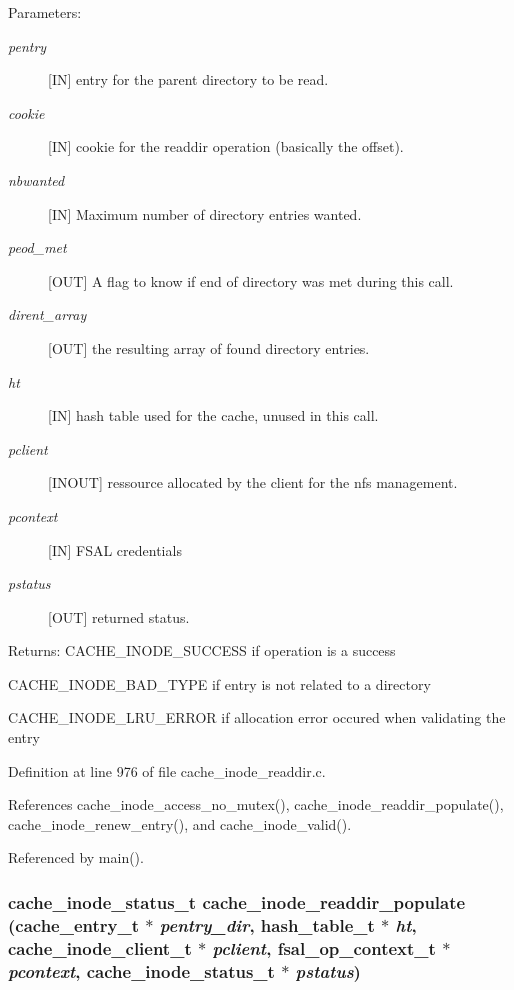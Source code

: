 \begin{Desc}
\item[Parameters:]
\begin{description}
\item[{\em pentry}][IN] entry for the parent directory to be read. \item[{\em cookie}][IN] cookie for the readdir operation (basically the offset). \item[{\em nbwanted}][IN] Maximum number of directory entries wanted. \item[{\em peod\_\-met}][OUT] A flag to know if end of directory was met during this call. \item[{\em dirent\_\-array}][OUT] the resulting array of found directory entries. \item[{\em ht}][IN] hash table used for the cache, unused in this call. \item[{\em pclient}][INOUT] ressource allocated by the client for the nfs management. \item[{\em pcontext}][IN] FSAL credentials \item[{\em pstatus}][OUT] returned status.\end{description}
\end{Desc}
\begin{Desc}
\item[Returns:]CACHE\_\-INODE\_\-SUCCESS if operation is a success \par
 

CACHE\_\-INODE\_\-BAD\_\-TYPE if entry is not related to a directory\par
 

CACHE\_\-INODE\_\-LRU\_\-ERROR if allocation error occured when validating the entry \end{Desc}


Definition at line 976 of file cache\_\-inode\_\-readdir.c.

References cache\_\-inode\_\-access\_\-no\_\-mutex(), cache\_\-inode\_\-readdir\_\-populate(), cache\_\-inode\_\-renew\_\-entry(), and cache\_\-inode\_\-valid().

Referenced by main().
\subsubsection{\setlength{\rightskip}{0pt plus 5cm}cache\_\-inode\_\-status\_\-t cache\_\-inode\_\-readdir\_\-populate (cache\_\-entry\_\-t $\ast$ {\em pentry\_\-dir}, hash\_\-table\_\-t $\ast$ {\em ht}, cache\_\-inode\_\-client\_\-t $\ast$ {\em pclient}, fsal\_\-op\_\-context\_\-t $\ast$ {\em pcontext}, cache\_\-inode\_\-status\_\-t $\ast$ {\em pstatus})}\label{cache__inode__readdir_8c_a4}


